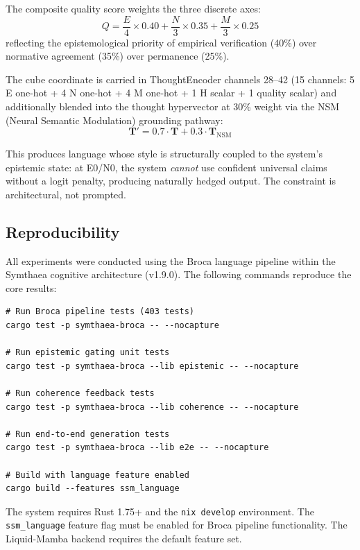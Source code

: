 \documentclass[12pt,a4paper]{article}
\begin{document}
The composite quality score weights the three discrete axes:
\begin{equation}
Q = \frac{E}{4} \times 0.40 + \frac{N}{3} \times 0.35 + \frac{M}{3} \times 0.25
\end{equation}
reflecting the epistemological priority of empirical verification (40\%) over normative agreement (35\%) over permanence (25\%).

The cube coordinate is carried in ThoughtEncoder channels 28--42 (15 channels: 5 E one-hot + 4 N one-hot + 4 M one-hot + 1 H scalar + 1 quality scalar) and additionally blended into the thought hypervector at 30\% weight via the NSM (Neural Semantic Modulation) grounding pathway:
\begin{equation}
\mathbf{T}' = 0.7 \cdot \mathbf{T} + 0.3 \cdot \mathbf{T}_{\text{NSM}}
\end{equation}

This produces language whose style is structurally coupled to the system's epistemic state: at E0/N0, the system \emph{cannot} use confident universal claims without a logit penalty, producing naturally hedged output. The constraint is architectural, not prompted.

\subsection*{Reproducibility}

All experiments were conducted using the Broca language pipeline within the Symthaea cognitive architecture (v1.9.0). The following commands reproduce the core results:

\begin{verbatim}
# Run Broca pipeline tests (403 tests)
cargo test -p symthaea-broca -- --nocapture

# Run epistemic gating unit tests
cargo test -p symthaea-broca --lib epistemic -- --nocapture

# Run coherence feedback tests
cargo test -p symthaea-broca --lib coherence -- --nocapture

# Run end-to-end generation tests
cargo test -p symthaea-broca --lib e2e -- --nocapture

# Build with language feature enabled
cargo build --features ssm_language
\end{verbatim}

The system requires Rust 1.75+ and the \texttt{nix develop} environment. The \texttt{ssm\_language} feature flag must be enabled for Broca pipeline functionality. The Liquid-Mamba backend requires the default feature set.
\end{document}
